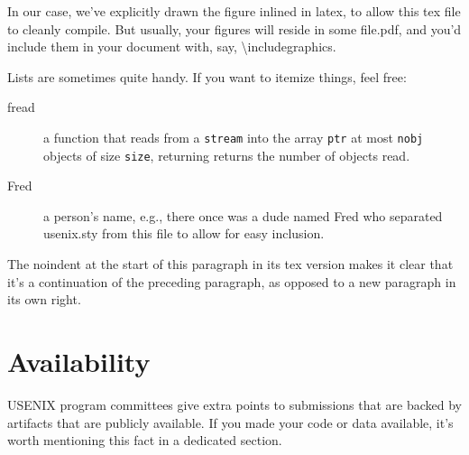 \documentclass[letterpaper,twocolumn,10pt]{article}
\begin{document}
In our case, we've explicitly drawn the figure inlined in latex, to
allow this tex file to cleanly compile. But usually, your figures will
reside in some file.pdf, and you'd include them in your document
with, say, \textbackslash{}includegraphics.

Lists are sometimes quite handy. If you want to itemize things, feel
free:

\begin{description}
  
\item[fread] a function that reads from a \texttt{stream} into the
  array \texttt{ptr} at most \texttt{nobj} objects of size
  \texttt{size}, returning returns the number of objects read.

\item[Fred] a person's name, e.g., there once was a dude named Fred
  who separated usenix.sty from this file to allow for easy
  inclusion.
\end{description}

\noindent
The noindent at the start of this paragraph in its tex version makes
it clear that it's a continuation of the preceding paragraph, as
opposed to a new paragraph in its own right.




\section*{Availability}

USENIX program committees give extra points to submissions that are
backed by artifacts that are publicly available. If you made your code
or data available, it's worth mentioning this fact in a dedicated
section.


% 


\end{document}
